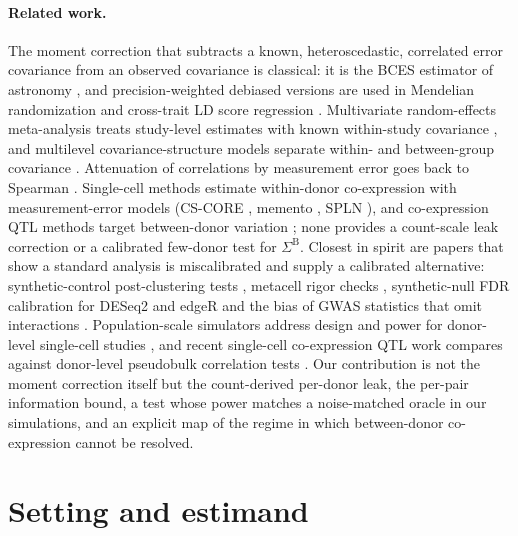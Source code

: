 \documentclass[10pt,letterpaper]{article}
\theoremstyle{definition}
\newcommand{\SB}{\Sigma^{\mathrm{B}}}
\begin{document}
\paragraph{Related work.}
The moment correction that subtracts a known, heteroscedastic, correlated error covariance from an observed covariance is classical: it is the BCES estimator of astronomy \citep{AkritasBershady1996,Kelly2007}, and precision-weighted debiased versions are used in Mendelian randomization \citep{Ye2021dIVW} and cross-trait LD score regression \citep{BulikSullivan2015b}. Multivariate random-effects meta-analysis treats study-level estimates with known within-study covariance \citep{JacksonWhiteRiley2013,RileyAbramsSutton2007}, and multilevel covariance-structure models separate within- and between-group covariance \citep{Muthen1994,Ludtke2008}. Attenuation of correlations by measurement error goes back to Spearman \citep{Spearman1904,Fuller1987}. Single-cell methods estimate within-donor co-expression with measurement-error models (CS-CORE \citep{Su2023CSCORE}, memento \citep{Kim2024memento}, SPLN \citep{GeLi2026SPLN}), and co-expression QTL methods target between-donor variation \citep{Li2023coeQTL}; none provides a count-scale leak correction or a calibrated few-donor test for $\SB$. Closest in spirit are papers that show a standard analysis is miscalibrated and supply a calibrated alternative: synthetic-control post-clustering tests \citep{Song2025ClusterDE}, metacell rigor checks \citep{Liu2025mcRigor}, synthetic-null FDR calibration for DESeq2 and edgeR \citep{Jiang2025Nullstrap} and the bias of GWAS statistics that omit interactions \citep{Yelmen2026}. Population-scale simulators address design and power for donor-level single-cell studies \citep{Dong2026scDesignPop}, and recent single-cell co-expression QTL work compares against donor-level pseudobulk correlation tests \citep{Zhang2026scpcQTL}. Our contribution is not the moment correction itself but the count-derived per-donor leak, the per-pair information bound, a test whose power matches a noise-matched oracle in our simulations, and an explicit map of the regime in which between-donor co-expression cannot be resolved.

\section{Setting and estimand}
\end{document}
